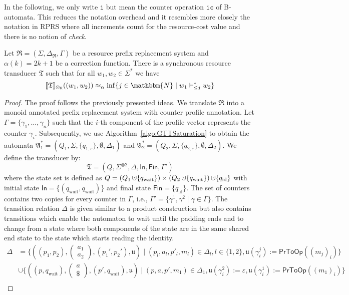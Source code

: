 \documentclass{LMCS}
\newcommand{\nat}{\mathbbm{N}}
\newcommand{\eps}{\varepsilon}
\newcommand{\DeltaR}{\Delta_{\mathfrak R}}
\DeclareMathOperator{\dotcup}{\mathaccent\cdot\cup}
\newcommand{\automatonA}{\mathfrak A}
\newcommand{\automatonT}{\mathfrak T}
\newcommand{\In}{\mathsf{In}}
\newcommand{\Fin}{\mathsf{Fin}}
\newcommand{\semantics}[1]{\llbracket#1\rrbracket}
\newcommand{\costEquiv}[1][\alpha]{\approx_{#1}}
\newcommand{\prsR}{\mathfrak R}
\newcommand{\configstepsLesserCost}[2][*]{\vdash^{#1}_{\le #2}}
\newcommand{\padprodR}{\otimes_{\mathsf{R}}}
\newcommand{\alphVector}[2]{#1^{\otimes #2}}
\newcommand{\iOp}{\ensuremath{\mathtt{i}}}
\newcommand{\icOp}{\ensuremath{\mathtt{i\! c}}}
\newcommand{\profileToOp}{\mathsf{PrToOp}}
\newcommand{\fraku}{\mathfrak u}
\newcommand{\RPRS}{\textsf{RPRS}}
\newcommand{\twovec}[2]{\begin{pmatrix}#1 \\ #2\end{pmatrix}}
\begin{document}
In the following, we only write $\iOp$ but mean the counter operation $\icOp$
of B-automata. This reduces the notation overhead and it resembles more closely
the notation in \RPRS{} where all increments count for the resource-cost value
and there is no notion of \emph{check}.

\begin{lem}
	Let $\prsR = (\Sigma,\DeltaR,\Gamma)$ be a resource prefix replacement
system and $\alpha(k) = 2k + 1$ be a correction function. There is a synchronous
resource transducer $\automatonT$ such that for all $w_1, w_2 \in \Sigma^*$ we have 
\[
\semantics{\automatonT}_{\padprodR}((w_1,w_2)) \costEquiv 
\inf \{ j \in \nat \mid  w_1 \configstepsLesserCost{j} w_2 \}
\]
\end{lem}
\begin{proof}
 The proof follows the previously presented ideas. We translate $\prsR$ into a
monoid annotated prefix replacement system with counter profile annotation. Let $\Gamma = \{\gamma_1, \ldots , \gamma_n \}$ such that the $i$-th component of the profile vector represents the counter $\gamma_i$. 
Subsequently, we use Algorithm~\ref{algo:GTTSaturation} to obtain the automata
$\automatonA_1^* = (Q_1, \Sigma, \{q_{1,\eps}\}, \emptyset,\Delta_1)$ and
$\automatonA_2^* = (Q_2, \Sigma, \{q_{2,\eps}\}, \emptyset, \Delta_2)$. We
define the transducer by: 
\[
	\automatonT = (Q, \alphVector{\Sigma}{2}, \Delta, \In, \Fin, \Gamma')
\]
where the state set is defined as $Q = (Q_1 \dotcup \{q_{\mathrm{wait}}\})
\times (Q_2 \dotcup \{q_{\mathrm{wait}}\}) \dotcup \{q_{\mathrm{id}}\}$ with
initial state $\In = \{(q_{\mathrm{wait}},q_{\mathrm{wait}})\}$ and final state
$\Fin = \{q_{\mathrm{id}}\}$. The set of counters contains two copies for every
counter in $\Gamma$, i.e., $\Gamma' = \{ \gamma^1, \gamma^2 \mid \gamma \in
\Gamma\}$. The transition relation $\Delta$ is given similar to a product
construction but also contains transitions which enable the automaton to wait
until the padding ends and to change from a state where both components of the
state are in the same shared end state to the state which starts reading the
identity. 
\begin{align*}
	\Delta &= \{ ((p_1,p_2),\twovec{a_1}{a_2},(p_1',p_2'),\fraku) \mid (p_l,a_l,p'_l,m_l) \in \Delta_l, l \in \{1,2\},\fraku(\gamma^j_i) := \profileToOp((m_j)_i) \} \\
	      &\cup \{((p,q_{\mathrm{wait}}),\twovec{a}{\$},(p',q_{\mathrm{wait}}),\fraku) \mid (p,a,p',m_1) \in \Delta_1, \fraku(\gamma^2_i) := \eps, \fraku(\gamma^1_i) := \profileToOp((m_1)_i)\} \\

\end{align*}
\end{proof}
\end{document}
